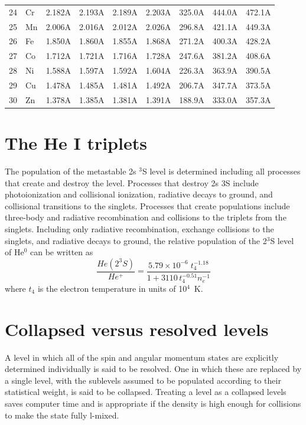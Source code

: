 \begin{table}
\begin{tabular}{lllllllll}
24&Cr& 2.182A& 2.193A& 2.189A& 2.203A& 325.0A& 444.0A& 472.1A\\
25& Mn& 2.006A& 2.016A& 2.012A& 2.026A& 296.8A& 421.1A& 449.3A\\
26& Fe& 1.850A& 1.860A& 1.855A& 1.868A& 271.2A& 400.3A& 428.2A\\
27& Co& 1.712A& 1.721A& 1.716A& 1.728A& 247.6A& 381.2A& 408.6A\\
28& Ni& 1.588A& 1.597A& 1.592A& 1.604A& 226.3A& 363.9A& 390.5A\\
29& Cu& 1.478A& 1.485A& 1.481A& 1.492A& 206.7A& 347.7A& 373.5A\\
30& Zn& 1.378A& 1.385A& 1.381A& 1.391A& 188.9A& 333.0A& 357.3A\\
\hline
\end{tabular}
\end{table}


\section{The He I triplets}

   The population of the metastable 2s $^3$S level is determined including
all processes that create and destroy the level.  Processes that destroy
2s 3S include photoionization and collisional ionization, radiative decays
to ground, and collisional transitions to the singlets.  Processes that
create populations include three-body and radiative recombination and
collisions to the triplets from the singlets.  Including only radiative
recombination, exchange collisions to the singlets, and radiative decays
to ground, the relative population of the 2$^3$S level of He$^0$ can be written
as
\begin{equation}
\frac{{He({2^3}S)}}{{H{e^ + }}} = \frac{{5.79 \times {{10}^{ - 6}}\;t_4^{
- 1.18}}}{{1 + 3110\,t_4^{ - 0.51}n_e^{ - 1}}}
\end{equation}
where $t_4$ is the electron temperature in units of 10$^4$~K.

\section{Collapsed versus resolved levels}

A level in which all of the spin and angular momentum states are
explicitly determined individually is said to be resolved.  One in which
these are replaced by a single level, with the sublevels assumed to be
populated according to their statistical weight, is said to be collapsed.
Treating a level as a collapsed levels saves computer time and is appropriate
if the density is high enough for collisions to make the state fully l-mixed.


